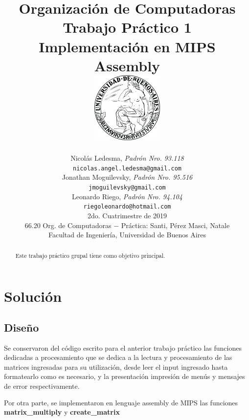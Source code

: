 \documentclass[a4paper,10pt, spanish]{article}
\title{
            \large{Organización de Computadoras} \\
            \textbf{Trabajo Práctico 1} \\
            \textbf{Implementación en MIPS Assembly} \\
            \bigskip
            \includegraphics[max height=100pt,max width=100pt]{./UBA.png} \\
}
\author{	Nicolás Ledesma, \textit{Padrón Nro. 93.118}                        \\
            \texttt{ nicolas.angel.ledesma@gmail.com }                           \\[2.5ex]
            Jonathan Moguilevsky, \textit{Padrón Nro. 95.516}                   \\
            \texttt{ jmoguilevsky@gmail.com }                                   \\[2.5ex]
            Leonardo Riego, \textit{Padrón Nro. 94.104}                 \\
            \texttt{ riegoleonardo@hotmail.com }                                          \\[2.5ex]
            \normalsize{2do. Cuatrimestre de 2019}                              \\
            \normalsize{66.20 Org. de Computadoras
                $-$ Práctica: Santi, Pérez Masci, Natale }                      \\
            \normalsize{Facultad de Ingeniería, Universidad de Buenos Aires}    \\
       }
\date{}
\begin{document}
\maketitle

\thispagestyle{empty}   %


\begin{abstract}
Este trabajo práctico grupal tiene como objetivo principal.
\end{abstract}

\pagebreak




\section{Solución}

\subsection{Diseño}
Se conservaron del código escrito para el anterior trabajo práctico las funciones dedicadas a procesamiento que se dedica a la lectura y procesamiento de las matrices ingresadas para su utilización, desde leer el input ingresado hasta formatearlo como es necesario, y la presentación impresión de menús y mensajes de error respectivamente.

Por otra parte, se implementaron en lenguaje assembly de MIPS las funciones \textbf{matrix\_multiply} y \textbf{create\_matrix}
\end{document}
